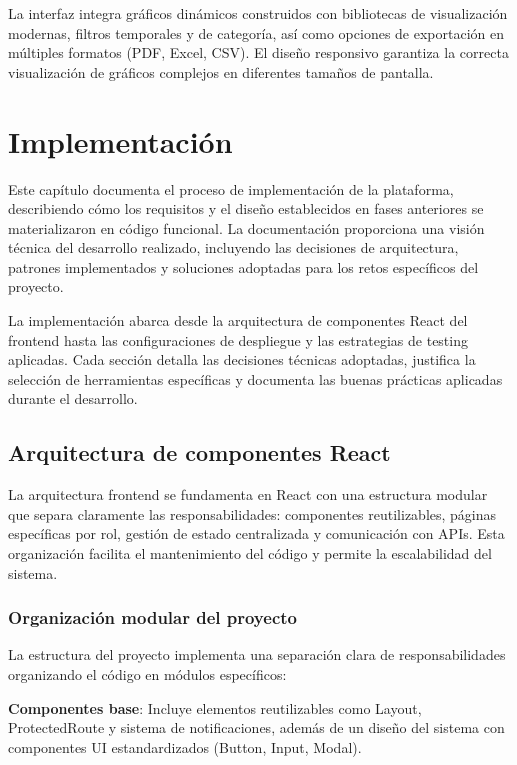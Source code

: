 \documentclass[12pt,a4paper,oneside]{report}
\begin{document}
La interfaz integra gráficos dinámicos construidos con bibliotecas de visualización modernas, filtros temporales y de categoría, así como opciones de exportación en múltiples formatos (PDF, Excel, CSV). El diseño responsivo garantiza la correcta visualización de gráficos complejos en diferentes tamaños de pantalla.

\chapter{Implementación}\label{implementaciuxf3n}
Este capítulo documenta el proceso de implementación de la plataforma, describiendo cómo los requisitos y el diseño establecidos en fases anteriores se materializaron en código funcional. La documentación proporciona una visión técnica del desarrollo realizado, incluyendo las decisiones de arquitectura, patrones implementados y soluciones adoptadas para los retos específicos del proyecto.

La implementación abarca desde la arquitectura de componentes React del frontend hasta las configuraciones de despliegue y las estrategias de testing aplicadas. Cada sección detalla las decisiones técnicas adoptadas, justifica la selección de herramientas específicas y documenta las buenas prácticas aplicadas durante el desarrollo.

\section{Arquitectura de componentes
React}\label{arquitectura-de-componentes-react-1}

La arquitectura frontend se fundamenta en React con una estructura modular que separa claramente las responsabilidades: componentes reutilizables, páginas específicas por rol, gestión de estado centralizada y comunicación con APIs. Esta organización facilita el mantenimiento del código y permite la escalabilidad del sistema.

\subsection{Organización modular del proyecto}\label{estructura-de-directorios}

La estructura del proyecto implementa una separación clara de responsabilidades organizando el código en módulos específicos:

\textbf{Componentes base}: Incluye elementos reutilizables como Layout, ProtectedRoute y sistema de notificaciones, además de un diseño del sistema con componentes UI estandardizados (Button, Input, Modal).
\end{document}
